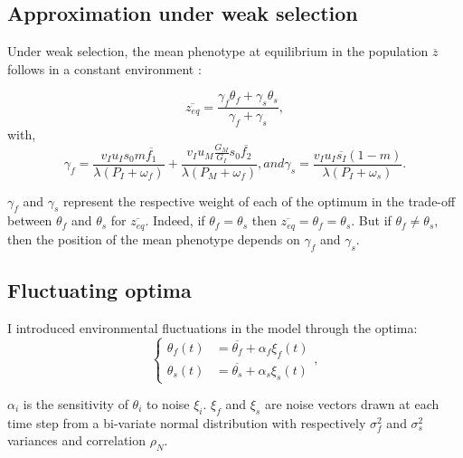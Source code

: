 \subsection*{Approximation under weak selection}

Under weak selection, the mean phenotype at equilibrium in the population $\overline{z}$ follows in a constant environment \citep{engen_evolution_2011}:

\begin{equation}
	\label{eq:zweak}
	\overline{z_{eq}} = \frac{\gamma_{f}\theta_{f} + \gamma_{s}\theta_{s}}{\gamma_{f} + \gamma_{s}},
\end{equation}
with,
\begin{subequations}
	\begin{equation}
	\label{eq:gammaf}
	\gamma_{f} = \frac{v_{I} u_{I} s_{0} m \overline{f_{1}} }{\lambda(P_{I}+\omega_{f})} + \frac{ v_{I} u_{M} \frac{G_{M}}{G_{I}} s_{0} \overline{f_{2}}}{\lambda ( P_{M} + \omega_{f} )},
	\end{equation}
	and
	\begin{equation}
	\label{eq:gammas}
	\gamma_{s} = \frac{ v_{I} u_{I} \overline{s_{I}} (1-m) }{\lambda(P_{I}+\omega_{s})}.
	\end{equation}
\end{subequations}

$\gamma_f$ and $\gamma_s$ represent the respective weight of each of the optimum in the trade-off between $\theta_f$ and $\theta_s$ for $\overline{z_{eq}}$. Indeed, if $\theta_f = \theta_s$ then $\overline{z_{eq}} = \theta_f = \theta_s$. But if $\theta_f \neq \theta_s$, then the position of the mean phenotype depends on $\gamma_f$ and $\gamma_s$.

\subsection*{Fluctuating optima}

I introduced environmental fluctuations in the model through the optima:
\begin{equation}
\left\{
	\begin{aligned}
		\theta_f(t) &= \overline{\theta_f} + \alpha_f \xi_f(t) \\
		\theta_s(t) &= \overline{\theta_s} + \alpha_s \xi_s(t)
	\end{aligned}
\right.,
\end{equation}

$\alpha_i$ is the sensitivity of $\theta_i$ to noise $\xi_i$. $\xi_f$ and $\xi_s$ are noise vectors drawn at each time step from a bi-variate normal distribution with respectively $\sigma_f^2$ and $\sigma_s^2$ variances and correlation $\rho_N$.

